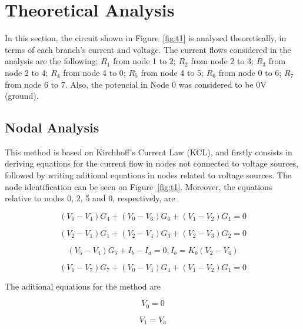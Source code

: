 \section{Theoretical Analysis}
\label{sec:analysis}

In this section, the circuit shown in Figure~\ref{fig:t1} is analysed
theoretically, in terms of each branch's current and voltage.
The current flows considered in the analysis are the following:
$R_1$ from node 1 to 2; $R_2$ from node 2 to 3; $R_3$ from node 2 to 4; $R_4$ from node 4 to 0; $R_5$ from node 4 to 5; $R_6$ from node 0 to 6; $R_7$ from node 6 to 7. Also, the potencial in Node 0 was considered to be 0V (ground).

\subsection{Nodal Analysis}

This method is based on Kirchhoff's Current Law (KCL), and firstly consists in
deriving equations for the current flow in nodes not connected to voltage sources,
followed by writing aditional equations in nodes related to voltage sources. The node 
identification can be seen on Figure~\ref{fig:t1}. Moreover, the equations relative to
nodes 0, 2, 5 and 0, respectively, are

\begin{equation}
  (V_0 - V_4)G_4 + (V_0 - V_6)G_6 + (V_1 - V_2)G_1 = 0 
  \label{eq:kvl}
\end{equation}

\begin{equation}
  (V_2 - V_1)G_1 + (V_2 - V_4)G_3 + (V_2 - V_3)G_2 = 0 
  \label{eq:kvl2}
\end{equation}

\begin{equation}
  (V_5 - V_4)G_5 + I_b - I_d = 0 , I_b = K_b(V_2 - V_4) 
  \label{eq:kvl3}
\end{equation}

\begin{equation}
  (V_6 - V_7)G_7 + (V_0 - V_4)G_4 + (V_1 - V_2)G_1 = 0 
  \label{eq:kvl4}
\end{equation}

The aditional equations for the method are

\begin{equation}
  V_0 = 0
  \label{eq:kvl5}
\end{equation}

\begin{equation}
  V_1 = V_a
  \label{eq:kvl6}
\end{equation}

